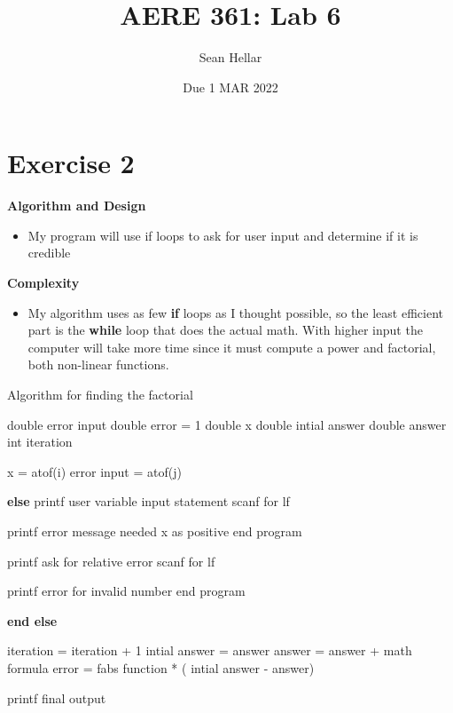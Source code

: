 \documentclass{article}
\title{AERE 361: Lab 6}
\date{Due 1 MAR 2022}
\author{Sean Hellar}
\begin{document}
\maketitle
\newpage

\section{Exercise 2}

\textbf{Algorithm and Design}
\begin{itemize}
\item{My program will use if loops to ask for user input and determine if it is credible}
\end{itemize}

\textbf{Complexity}
\begin{itemize}
\item{My algorithm uses as few \textbf{if} loops as I thought possible, so the least efficient part is the \textbf{while} loop that does the actual math. With higher input the computer will take more time since it must compute a power and factorial, both non-linear functions.}
\end{itemize}



\begin{algorithm}
  \caption{Algorithm for finding the factorial}

  \begin{algorithmic}
    \Statex {}
    \State double error input
    \State double error = 1
    \State double x
    \State double intial answer
    \State double answer
    \State int iteration

    \State {}
    \State x = atof(i)
    \State error input = atof(j)
    \EndIf

    \State {}
    \State \textbf{else}
    \State printf user variable input statement
    \State scanf for lf

    \State {}
    \State printf error message needed x as positive
    \State end program
    \EndIf

    \State
    \State printf ask for relative error
    \State scanf for lf

    \State {}
    \State printf error for invalid number
    \State end program
    \EndIf

    \State
    \State \textbf{end else}

    \State {}
    \State iteration = iteration + 1
    \State intial answer = answer
    \State answer = answer + math formula
    \State error = fabs function * ( intial answer - answer)
    \EndWhile

    \State
    \State printf final output
 
  \end{algorithmic}
\end{algorithm}

    
    
\end{document}

